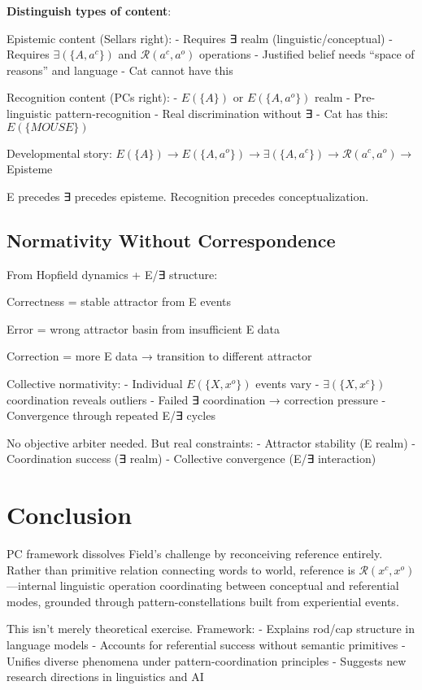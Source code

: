 \documentclass[12pt]{article}
\begin{document}
\textbf{Distinguish types of content}:

Epistemic content (Sellars right): - Requires ∃ realm (linguistic/conceptual) - Requires \(\exists(\{A, a^c\})\) and \(\mathcal{R}(a^c, a^o)\) operations - Justified belief needs ``space of reasons'' and language - Cat cannot have this

Recognition content (PCs right): - \(E(\{A\})\) or \(E(\{A, a^o\})\) realm - Pre-linguistic pattern-recognition - Real discrimination without ∃ - Cat has this: \(E(\{MOUSE\})\)

Developmental story: \(E(\{A\}) \rightarrow E(\{A, a^o\}) \rightarrow \exists(\{A, a^c\}) \rightarrow \mathcal{R}(a^c, a^o) \rightarrow\) Episteme

E precedes ∃ precedes episteme. Recognition precedes conceptualization.

\subsection{Normativity Without Correspondence}\label{normativity-without-correspondence}

From Hopfield dynamics + E/∃ structure:

Correctness = stable attractor from E events

Error = wrong attractor basin from insufficient E data

Correction = more E data → transition to different attractor

Collective normativity: - Individual \(E(\{X, x^o\})\) events vary - \(\exists(\{X, x^c\})\) coordination reveals outliers - Failed ∃ coordination → correction pressure - Convergence through repeated E/∃ cycles

No objective arbiter needed. But real constraints: - Attractor stability (E realm) - Coordination success (∃ realm) - Collective convergence (E/∃ interaction)

\section{Conclusion}\label{conclusion}

PC framework dissolves Field's challenge by reconceiving reference entirely. Rather than primitive relation connecting words to world, reference is \(\mathcal{R}(x^c, x^o)\)---internal linguistic operation coordinating between conceptual and referential modes, grounded through pattern-constellations built from experiential events.

This isn't merely theoretical exercise. Framework: - Explains rod/cap structure in language models - Accounts for referential success without semantic primitives - Unifies diverse phenomena under pattern-coordination principles - Suggests new research directions in linguistics and AI
\end{document}
